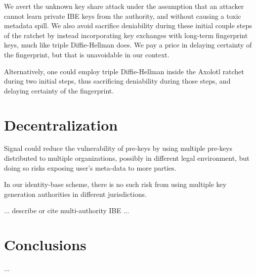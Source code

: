 \documentclass[twoside,letterpaper]{sig-alternate}
\begin{document}
We avert the unknown key share attack under the assumption that
an attacker cannot learn private IBE keys from the authority, and
 without causing a toxic metadata spill.
We also avoid sacrifice deniability during these initial couple steps of
the ratchet by instead incorporating key exchanges with long-term
fingerprint keys, much like triple Diffie-Hellman does.
We pay a price in delaying certainty of the fingerprint, but
 that is unavoidable in our context.


Alternatively, one could employ triple Diffie-Hellman inside the
Axolotl ratchet during two initial steps,
 thus sacrificing deniability during those steps,
 and delaying certainty of the fingerprint.



\section{Decentralization}

Signal could reduce the vulnerability of pre-keys by using
multiple pre-keys distributed to multiple organizations,
 possibly in different legal environment, but
doing so risks exposing user's meta-data to more parties.

In our identity-base scheme, there is no such risk from using
multiple key generation authorities in different jurisdictions.

... describe or cite multi-authority IBE ...


\section{Conclusions}

...







\end{document}
